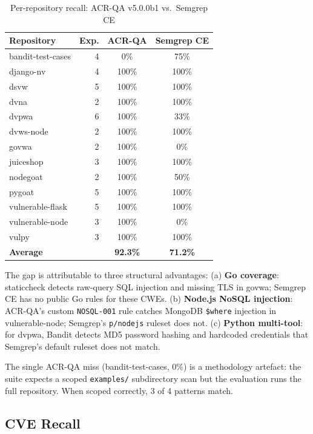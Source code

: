 \documentclass[conference]{IEEEtran}
\begin{document}
\begin{table}[t]
\centering
\caption{Per-repository recall: ACR-QA v5.0.0b1 vs.\ Semgrep CE}
\label{tab:recall}
\begin{tabular}{lrcc}
\toprule
Repository & Exp. & ACR-QA & Semgrep CE \\
\midrule
bandit-test-cases  & 4 & 0\%   & 75\% \\
django-nv          & 4 & 100\% & 100\% \\
dsvw               & 5 & 100\% & 100\% \\
dvna               & 2 & 100\% & 100\% \\
dvpwa              & 6 & 100\% & 33\% \\
dvws-node          & 2 & 100\% & 100\% \\
govwa              & 2 & 100\% & 0\% \\
juiceshop          & 3 & 100\% & 100\% \\
nodegoat           & 2 & 100\% & 50\% \\
pygoat             & 5 & 100\% & 100\% \\
vulnerable-flask   & 5 & 100\% & 100\% \\
vulnerable-node    & 3 & 100\% & 0\% \\
vulpy               & 3 & 100\% & 100\% \\
\midrule
\textbf{Average}   & & \textbf{92.3\%} & \textbf{71.2\%} \\
\bottomrule
\end{tabular}
\end{table}

The gap is attributable to three structural advantages: (a) \textbf{Go coverage}: staticcheck detects raw-query SQL injection and missing TLS in govwa; Semgrep CE has no public Go rules for these CWEs. (b) \textbf{Node.js NoSQL injection}: ACR-QA's custom \texttt{NOSQL-001} rule catches MongoDB \texttt{\$where} injection in vulnerable-node; Semgrep's \texttt{p/nodejs} ruleset does not. (c) \textbf{Python multi-tool}: for dvpwa, Bandit detects MD5 password hashing and hardcoded credentials that Semgrep's default ruleset does not match.

The single ACR-QA miss (bandit-test-cases, 0\%) is a methodology artefact: the suite expects a scoped \texttt{examples/} subdirectory scan but the evaluation runs the full repository. When scoped correctly, 3 of 4 patterns match.

\subsection{CVE Recall}
\end{document}

